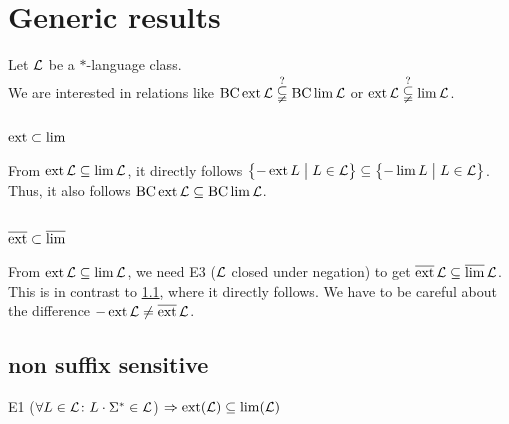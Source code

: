 \section{Generic results}


Let $\mathcal{L}$ be a $*$-language class.
\\

We are interested in relations like $\operatorname{BC} \operatorname{ext} \mathcal{L} \overset{?}{\subsetneqq} \operatorname{BC} \lim \mathcal{L}$ or $\operatorname{ext} \mathcal{L} \overset{?}{\subsetneqq} \lim \mathcal{L}$.

\subsection{$\operatorname{ext} \subset \lim$}
\label{gen:S302a}

From $\operatorname{ext} \mathcal{L} \subseteq \lim \mathcal{L}$, it directly follows $\Set{-\ext L}{L \in \Lang} \subseteq \Set{-\lim L}{L \in \Lang}$. Thus, it also follows $\operatorname{BC} \operatorname{ext} \mathcal{L} \subseteq \operatorname{BC} \lim \mathcal{L}$.

\subsection{$\operatorname{\overline{ext}} \subset \operatorname{\overline{lim}}$}

From $\operatorname{ext} \mathcal{L} \subseteq \lim \mathcal{L}$, we need E3 ($\mathcal{L}$ closed under negation) to get $\operatorname{\overline{ext}} \mathcal{L} \subseteq \operatorname{\overline{lim}} \mathcal{L}$. This is in contrast to \ref{gen:S302a}, where it directly follows. We have to be careful about the difference $- \operatorname{ext} \mathcal{L} \neq \operatorname{\overline{ext}} \mathcal{L}$. 

\subsection{non suffix sensitive}
\label{gen:non-suffix-sens}

E1 ($\forall L \in \mathcal{L} \colon L \cdot \Sigma^* \in \mathcal{L}$)
$\Rightarrow \operatorname{ext}(\mathcal{L}) \subseteq \lim(\mathcal{L})$

